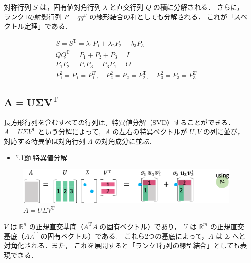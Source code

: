 \documentclass[letterpaper]{article}
\DeclareRobustCommand\transp{^{\mathrm{T}}}
\begin{document}
対称行列 $S$ は，固有値対角行列 $\lambda$ と直交行列 $Q$ の積に分解される．
さらに，ランク1の射影行列 $P=qq\transp$ の線形結合の和としても分解される．
これが「スペクトル定理」である．

\begin{gather*}
  S=S\transp = \lambda_1 P_1 + \lambda_2 P_2 + \lambda_3 P_3\\
  QQ\transp = P_1 + P_2 + P_3 = I \\
  P_1 P_2 = P_2 P_3 = P_3 P_1 = O\\
  P_1^2 =P_1=P_1\transp, \quad P_2^2=P_2=P_2\transp, \quad P_3^2=P_3=P_3\transp
\end{gather*}

\clearpage

\subsection{$\boldsymbol{A=U \Sigma V\transp}$}

長方形行列を含むすべての行列は，特異値分解（SVD）することができる．
$A=U \Sigma V\transp$ という分解によって，$A$ の左右の特異ベクトルが $U, V$ の列に並び，
対応する特異値は対角行列 $\Lambda$ の対角成分に並ぶ．

\begin{itemize}
  \item 7.1節 特異値分解
\end{itemize}

\begin{figure}[H]
  \includegraphics[keepaspectratio, width=\linewidth]{SVD-j.eps}
  \caption{$A=U \Sigma V\transp$}
\end{figure}

$V$ は $\mathbb{R}^n$ の正規直交基底（$A\transp A$ の固有ベクトル）であり，
$U$ は $\mathbb{R}^m$ の正規直交基底（$AA\transp$ の固有ベクトル）である．
これら2つの基底によって，$A$ は $\Sigma$ へと対角化される．また，
これを展開すると「ランク1行列の線型結合」としても表現できる．
\end{document}
